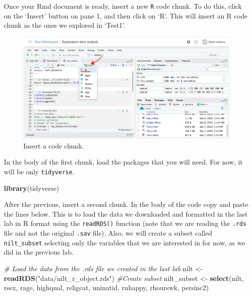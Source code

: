 \documentclass[
]{book}
\newenvironment{Shaded}{\begin{snugshade}}{\end{snugshade}}
\newcommand{\CommentTok}[1]{\textcolor[rgb]{0.56,0.35,0.01}{\textit{#1}}}
\newcommand{\FunctionTok}[1]{\textcolor[rgb]{0.13,0.29,0.53}{\textbf{#1}}}
\newcommand{\NormalTok}[1]{#1}
\newcommand{\OtherTok}[1]{\textcolor[rgb]{0.56,0.35,0.01}{#1}}
\newcommand{\StringTok}[1]{\textcolor[rgb]{0.31,0.60,0.02}{#1}}
\begin{document}
Once your Rmd document is ready, insert a new \texttt{R} code chunk. To do this, click on the `Insert' button on pane 1, and then click on `R'. This will insert an R code chunk as the ones we explored in `Test1'.

\begin{figure}

\includegraphics[width=1\linewidth]{./images/Lab4_chunk} \hfill{}

\caption{Insert a code chunk.}\label{fig:unnamed-chunk-62}
\end{figure}

In the body of the first chunk, load the packages that you will need. For now, it will be only \texttt{tidyverse}.

\begin{Shaded}
\begin{Highlighting}[]
\FunctionTok{library}\NormalTok{(tidyverse)}
\end{Highlighting}
\end{Shaded}

After the previous, insert a second chunk. In the body of the code copy and paste the lines below. This is to load the data we downloaded and formatted in the last lab in R format using the \texttt{readRDS()} function (note that we are reading the \texttt{.rds} file and not the original \texttt{.sav} file). Also, we will create a subset called \texttt{nilt\_subset} selecting only the variables that we are interested in for now, as we did in the previous lab.

\begin{Shaded}
\begin{Highlighting}[]
\CommentTok{\# Load the data from the .rds file we created in the last lab}
\NormalTok{nilt }\OtherTok{\textless{}{-}} \FunctionTok{readRDS}\NormalTok{(}\StringTok{"data/nilt\_r\_object.rds"}\NormalTok{)}
\CommentTok{\#Create subset}
\NormalTok{nilt\_subset }\OtherTok{\textless{}{-}} \FunctionTok{select}\NormalTok{(nilt, rsex, rage, highqual, religcat, uninatid,  ruhappy, rhourswk, persinc2)}
\end{Highlighting}
\end{Shaded}
\end{document}
